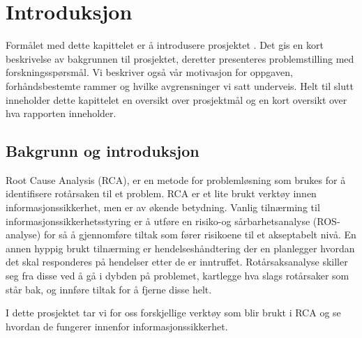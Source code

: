 \chapter{Introduksjon}
\label{kap:introduksjon}
Formålet med dette kapittelet er å introdusere prosjektet . Det gis en kort beskrivelse av bakgrunnen til prosjektet, deretter presenteres problemstilling med forskningsspørsmål. Vi beskriver også vår motivasjon for oppgaven,  forhåndsbestemte rammer og hvilke avgrensninger vi satt underveis. Helt til slutt inneholder dette kapittelet en oversikt over prosjektmål og en kort oversikt over hva rapporten inneholder.


\section{Bakgrunn og introduksjon}
\label{sec:bakgrunn}
Root Cause Analysis (RCA), er en metode for problemløsning som brukes for å identifisere rotårsaken til et problem. RCA er et lite brukt verktøy innen informasjonssikkerhet, men er av økende betydning. Vanlig tilnærming til informasjonssikkerhetsstyring er å utføre en risiko-og sårbarhetsanalyse (ROS-analyse) for så å gjennomføre tiltak som fører risikoene til et akseptabelt nivå. En annen hyppig brukt tilnærming er hendelseshåndtering der en planlegger hvordan det skal responderes på hendelser etter de er inntruffet. Rotårsaksanalyse skiller seg fra disse ved å gå i dybden på problemet, kartlegge hva slags rotårsaker som står bak, og innføre tiltak for å fjerne disse helt. 

I dette prosjektet tar vi for oss forskjellige verktøy som blir brukt i RCA og se hvordan de fungerer innenfor informasjonssikkerhet. 